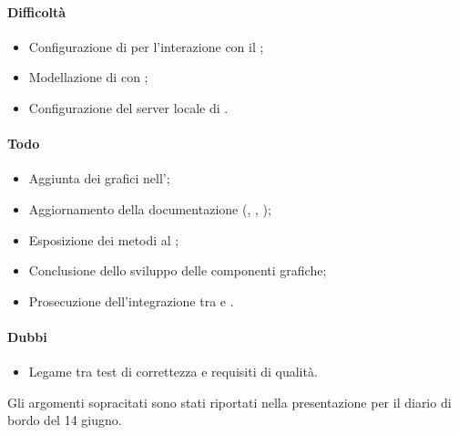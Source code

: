 \paragraph{Difficoltà}
\begin{itemize}
	\item Configurazione di  per l'interazione con il ;
	\item Modellazione di  con ;
	\item Configurazione del server locale di .
\end{itemize}	

\paragraph{Todo}
\begin{itemize}
	\item Aggiunta dei grafici nell'\AdR;
	\item Aggiornamento della documentazione (\PdP, \PdQ, \AdR);
	\item Esposizione dei metodi al ;
	\item Conclusione dello sviluppo delle componenti grafiche;
	\item Prosecuzione dell'integrazione tra  e .		
\end{itemize}

\paragraph{Dubbi}
\begin{itemize}
	\item Legame tra test di correttezza e requisiti di qualità.
\end{itemize}

\vspace{0.5\baselineskip}
\par Gli argomenti sopracitati sono stati riportati nella presentazione per il diario di bordo del 14 giugno.
